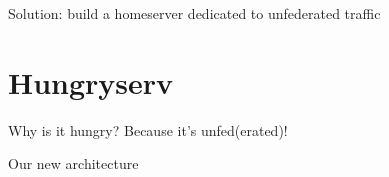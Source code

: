 \documentclass{beeper}
\begin{document}
\begin{frame}[standout]
    \Large
    Solution: build a homeserver dedicated to unfederated traffic
\end{frame}

\section{Hungryserv}

\begin{frame}{Why is it hungry?}
    \Large
    Because it's unfed(erated)!
\end{frame}

\begin{frame}{Our new architecture}

\end{frame}
\end{document}
